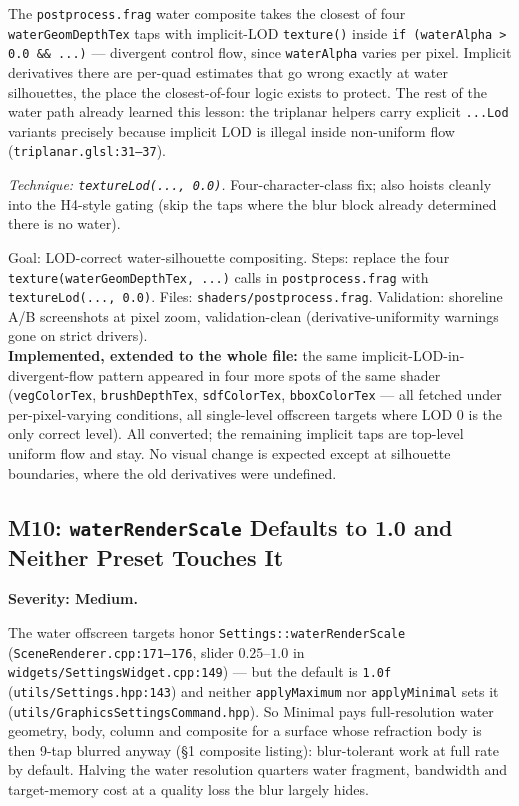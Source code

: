 \documentclass[11pt,a4paper]{article}
\begin{document}
The \texttt{postprocess.frag} water composite takes the closest of four
\texttt{waterGeomDepthTex} taps with implicit-LOD \texttt{texture()} inside
\texttt{if (waterAlpha > 0.0 \&\& ...)} --- divergent control flow, since
\texttt{waterAlpha} varies per pixel. Implicit derivatives there are
per-quad estimates that go wrong exactly at water silhouettes, the place the
closest-of-four logic exists to protect. The rest of the water path already
learned this lesson: the triplanar helpers carry explicit
\texttt{...Lod} variants precisely because implicit LOD is illegal inside
non-uniform flow (\texttt{triplanar.glsl:31--37}).

\textit{Technique: \texttt{textureLod(..., 0.0)}.} Four-character-class fix;
also hoists cleanly into the H4-style gating (skip the taps where the blur
block already determined there is no water).

\begin{tcolorbox}[promptbox={Prompt --- M9: explicit LOD in the composite depth taps}]
Goal: LOD-correct water-silhouette compositing. Steps: replace the four
\texttt{texture(waterGeomDepthTex, ...)} calls in \texttt{postprocess.frag}
with \texttt{textureLod(..., 0.0)}. Files:
\texttt{shaders/postprocess.frag}. Validation: shoreline A/B screenshots at
pixel zoom, validation-clean (derivative-uniformity warnings gone on strict
drivers).
\\ \textbf{Implemented, extended to the whole file:} the same
implicit-LOD-in-divergent-flow pattern appeared in four more spots of the
same shader (\texttt{vegColorTex}, \texttt{brushDepthTex},
\texttt{sdfColorTex}, \texttt{bboxColorTex} --- all fetched under
per-pixel-varying conditions, all single-level offscreen targets where LOD 0
is the only correct level). All converted; the remaining implicit taps are
top-level uniform flow and stay. No visual change is expected except at
silhouette boundaries, where the old derivatives were undefined.
\end{tcolorbox}

\subsection{M10: \texttt{waterRenderScale} Defaults to 1.0 and Neither Preset Touches It}
\label{sec:m10}

\textbf{Severity: Medium.}

The water offscreen targets honor \texttt{Settings::waterRenderScale}
(\texttt{SceneRenderer.cpp:171--176}, slider $0.25$--$1.0$ in
\texttt{widgets/SettingsWidget.cpp:149}) --- but the default is
\texttt{1.0f} (\texttt{utils/Settings.hpp:143}) and neither
\texttt{applyMaximum} nor \texttt{applyMinimal} sets it
(\texttt{utils/GraphicsSettingsCommand.hpp}). So Minimal pays full-resolution
water geometry, body, column and composite for a surface whose refraction body
is then 9-tap blurred anyway (\S1 composite listing): blur-tolerant work at
full rate by default. Halving the water resolution quarters water fragment,
bandwidth and target-memory cost at a quality loss the blur largely hides.
\end{document}
